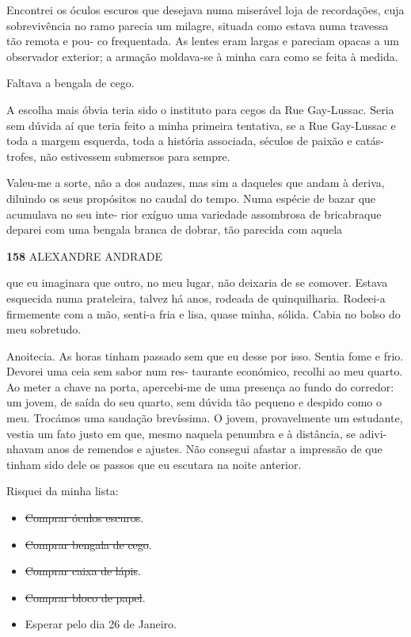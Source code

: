Encontrei os óculos escuros que desejava numa miserável loja de
recordações, cuja sobrevivência no ramo parecia um milagre, situada como
estava numa travessa tão remota e pou- co frequentada. As lentes eram
largas e pareciam opacas a um observador exterior; a armação moldava-se
à minha cara como se feita à medida.

Faltava a bengala de cego.

A escolha mais óbvia teria sido o instituto para cegos da Rue
Gay-Lussac. Seria sem dúvida aí que teria feito a minha primeira
tentativa, se a Rue Gay-Lussac e toda a margem esquerda, toda a história
associada, séculos de paixão e catás- trofes, não estivessem submersos
para sempre.

Valeu-me a sorte, não a dos audazes, mas sim a daqueles que andam à
deriva, diluindo os seus propósitos no caudal do tempo. Numa espécie de
bazar que acumulava no seu inte- rior exíguo uma variedade assombrosa de
bricabraque deparei com uma bengala branca de dobrar, tão parecida com
aquela

\textbf{158 }ALEXANDRE ANDRADE

que eu imaginara que outro, no meu lugar, não deixaria de se comover.
Estava esquecida numa prateleira, talvez há anos, rodeada de
quinquilharia. Rodeei-a firmemente com a mão, senti-a fria e lisa, quase
minha, sólida. Cabia no bolso do meu sobretudo.

Anoitecia. As horas tinham passado sem que eu desse por isso. Sentia
fome e frio. Devorei uma ceia sem sabor num res- taurante económico,
recolhi ao meu quarto. Ao meter a chave na porta, apercebi-me de uma
presença ao fundo do corredor: um jovem, de saída do seu quarto, sem
dúvida tão pequeno e despido como o meu. Trocámos uma saudação
brevíssima. O jovem, provavelmente um estudante, vestia um fato justo em
que, mesmo naquela penumbra e à distância, se adivi- nhavam anos de
remendos e ajustes. Não consegui afastar a impressão de que tinham sido
dele os passos que eu escutara na noite anterior.

Risquei da minha lista:

\begin{itemize}
\tightlist
\item
  \sout{Comprar óculos escuros}.
\item
  \sout{Comprar bengala de cego}.
\item
  \sout{Comprar caixa de lápis}.
\item
  \sout{Comprar bloco de papel}.
\item
  Esperar pelo dia 26 de Janeiro.
\end{itemize}

